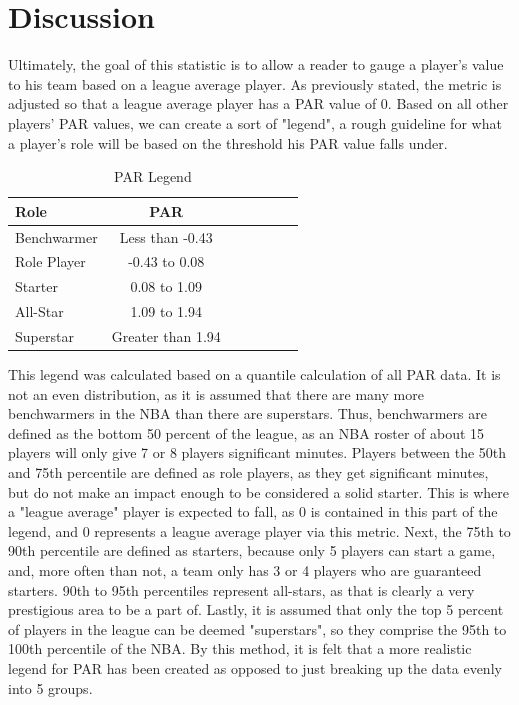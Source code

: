 \documentclass[12pt, titlepage]{article}
\begin{document}
\section{Discussion}
Ultimately, the goal of this statistic is to allow a reader to gauge a player's value to his team based on a 
league average player. As previously stated, the metric is adjusted so that a league average player has a 
PAR value of 0. Based on all other players' PAR values, we can create a sort of "legend", a rough guideline 
for what a player's role will be based on the threshold his PAR value falls under.

\begin{table}[H]
  \caption{PAR Legend}
  \label{tab:PARLegend}
\centering
\begin{tabular}[t]{lccllll}
  \toprule
  Role &  PAR\\
  \midrule
Benchwarmer & Less than -0.43\\
  \midrule
Role Player & -0.43 to 0.08\\
  \midrule
Starter & 0.08 to 1.09\\
  \midrule
All-Star & 1.09 to 1.94\\
 \midrule
Superstar & Greater than 1.94\\
  \bottomrule
\end{tabular}
\end{table}

This legend was calculated based on a quantile calculation of all PAR data. It is not an even distribution, as 
it is assumed that there are many more benchwarmers in the NBA than there are superstars. Thus, 
benchwarmers are defined as the bottom 50 percent of the league, as an NBA roster of about 15 players 
will only give 7 or 8 players significant minutes. Players between the 50th and 75th percentile are defined 
as role players, as they get significant minutes, but do not make an impact enough to be considered a solid 
starter. This is where  a "league average" player is expected to fall, as 0 is contained in this part of the 
legend, and 0 represents a league average player via this metric. Next, the 75th to 90th percentile are 
defined as starters, because only 5 players can start a game, and, more often than not, a team only has 3 
or 4 players who are guaranteed starters. 90th to 95th percentiles represent all-stars, as that is clearly a 
very prestigious area to be a part of. Lastly, it is assumed that only the top 5 percent of players in the 
league can be deemed "superstars", so they comprise the 95th to 100th percentile of the NBA. By this 
method, it is felt that a more realistic legend for PAR has been created as opposed to just breaking up the 
data evenly into 5 groups.
\end{document}
